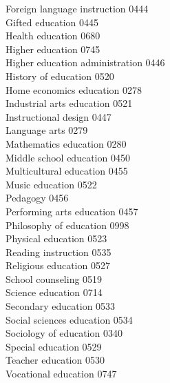\documentclass[9pt]{article}
\begin{document}
\begin{multicols}{3}
Foreign language instruction \hfill 0444 \leavevmode \\
Gifted education \hfill 0445 \leavevmode \\
Health education \hfill 0680 \leavevmode \\
Higher education \hfill 0745 \leavevmode \\
Higher education administration \hfill 0446 \leavevmode \\
History of education \hfill 0520 \leavevmode \\
Home economics education \hfill 0278 \leavevmode \\
Industrial arts education \hfill 0521 \leavevmode \\
Instructional design \hfill 0447 \leavevmode \\
Language arts \hfill 0279 \leavevmode \\
Mathematics education \hfill 0280 \leavevmode \\
Middle school education \hfill 0450 \leavevmode \\
Multicultural education \hfill 0455 \leavevmode \\
Music education \hfill 0522 \leavevmode \\
Pedagogy \hfill 0456 \leavevmode \\
Performing arts education \hfill 0457 \leavevmode \\
Philosophy of education \hfill 0998 \leavevmode \\
Physical education \hfill 0523 \leavevmode \\
Reading instruction \hfill 0535 \leavevmode \\
Religious education \hfill 0527 \leavevmode \\
School counseling \hfill 0519 \leavevmode \\
Science education \hfill 0714 \leavevmode \\
Secondary education \hfill 0533 \leavevmode \\
Social sciences education \hfill 0534 \leavevmode \\
Sociology of education \hfill 0340 \leavevmode \\
Special education \hfill 0529 \leavevmode \\
Teacher education \hfill 0530 \leavevmode \\
Vocational education \hfill 0747
\clearpage


\end{multicols}
\end{document}
